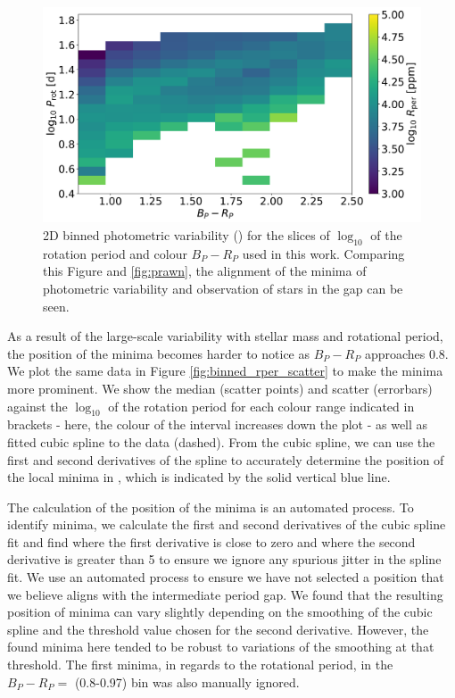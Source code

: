 \begin{figure}
\centering
  \includegraphics[width=\textwidth]{Figures/rot_gap_figures/rot_dist_binned.png}
  \caption{
  2D binned photometric variability (\rper{}) for the slices of $\log_{10}$ of the rotation period and colour \gaia $B_P-R_P$ used in this work. Comparing this Figure and \ref{fig:prawn}, the alignment of the minima of photometric variability and observation of stars in the gap can be seen.}
  \label{fig:binned_rper_full_sample}
\end{figure}

As a result of the large-scale variability with stellar mass and rotational period, the position of the minima becomes harder to notice as $B_P - R_P$ approaches 0.8.
We plot the same data in Figure \ref{fig:binned_rper_scatter} to make the minima more prominent.
We show the median \rper{} (scatter points) and scatter (errorbars) against the $\log_{10}$ of the rotation period for each colour range indicated in brackets - here, the colour of the interval increases down the plot - as well as fitted cubic spline to the data (dashed).
From the cubic spline, we can use the first and second derivatives of the spline to accurately determine the position of the local minima in \rper{}, which is indicated by the solid vertical blue line.

The calculation of the position of the minima is an automated process.
To identify minima, we calculate the first and second derivatives of the cubic spline fit and find where the first derivative is close to zero and where the second derivative is greater than 5 to ensure we ignore any spurious jitter in the spline fit.
We use an automated process to ensure we have not selected a position that we believe aligns with the intermediate period gap.
We found that the resulting position of minima can vary slightly depending on the smoothing of the cubic spline and the threshold value chosen for the second derivative.
However, the found minima here tended to be robust to variations of the smoothing at that threshold.
The first minima, in regards to the rotational period, in the $B_P-R_P =$ (0.8-0.97) bin was also manually ignored.

